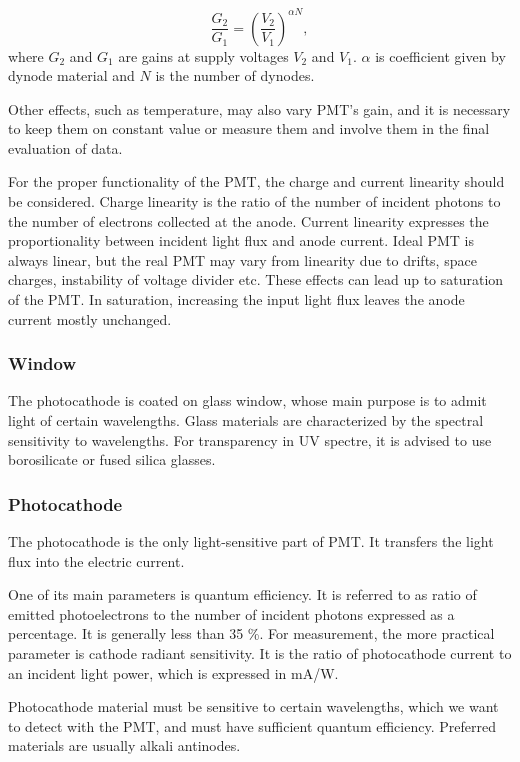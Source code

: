 \begin{equation}
\frac{G_2}{G_1} = (\frac{V_2}{V_1})^{\alpha N},
\label{gainVolt}
\end{equation}
where $G_2$ and $G_1$ are gains at supply voltages $V_2$ and $V_1$. $\alpha$ is coefficient given by dynode material and $N$ is the number of dynodes.
\par
Other effects, such as temperature, may also vary PMT's gain, and it is necessary to keep them on constant value or measure them and involve them in the final evaluation of data.
\par
For the proper functionality of the PMT, the charge and current linearity should be considered. Charge linearity is the ratio of the number of incident photons to the number of electrons collected at the anode. Current linearity expresses the proportionality between incident light flux and anode current. Ideal PMT is always linear, but the real PMT may vary from linearity due to drifts, space charges, instability of voltage divider etc. These effects can lead up to saturation of the PMT. In saturation, increasing the input light flux leaves the anode current mostly unchanged.      


\subsubsection{Window}

The photocathode is coated on glass window, whose main purpose is to admit light of certain wavelengths. Glass materials are characterized by the spectral sensitivity to wavelengths. For transparency in UV spectre, it is advised to use borosilicate or fused silica glasses.


\subsubsection{Photocathode}

The photocathode is the only light-sensitive part of PMT. It transfers the light flux into the electric current.
\par
One of its main parameters is quantum efficiency. It is referred to as ratio of emitted photoelectrons to the number of incident photons expressed as a percentage. It is generally less than 35 \%. For measurement, the more practical parameter is cathode radiant sensitivity. It is the ratio of photocathode current to an incident light power, which is expressed in mA/W.
\par
Photocathode material must be sensitive to certain wavelengths, which we want to detect with the PMT, and must have sufficient quantum efficiency. Preferred materials are usually alkali antinodes.
